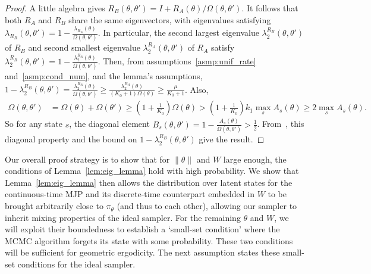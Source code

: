 \begin{proof}
A little algebra gives $R_B(\theta,\theta') = I + R_A(\theta)/\Omega(\theta,\theta')$. It 
follows that both $R_A$ and $R_B$ share the same eigenvectors, with 
eigenvalues satisfying 
$\lambda_{R_B}(\theta, \theta') = 1 - \frac{\lambda_{R_A}(\theta)}{\Omega(\theta,
\theta')}$. In particular, the second largest eigenvalue 
$\lambda_2^{R_B}(\theta,\theta')$ of $R_B$ and  
second smallest eigenvalue $\lambda^{R_A}_2(\theta,\theta')$ of $R_A$ satisfy  
$\lambda^{R_B}_2(\theta,\theta') = 1 - \frac{\lambda^{R_A}_2(\theta)}{\Omega(\theta, \theta')}$.
Then, from assumptions~\ref{asmp:unif_rate} and~\ref{asmp:cond_num}, and 
the lemma's assumptions, 
$1 - \lambda^{R_B}_2(\theta,\theta') = \frac{\lambda^{R_A}_2(\theta)}{\Omega(\theta, \theta')} 
\ge \frac{\lambda^{R_A}_2(\theta)}{(K_0+1)\Omega(\theta)} 
\ge \frac{\mu}{K_0+1} $. 
Also, 
\begin{align*}
\Omega(\theta, \theta') &= \Omega(\theta) + \Omega(\theta') \ge (1 + \frac{1}{K_0})\Omega(\theta)
 > (1 + \frac{1}{K_0})k_1\max_s A_{s}(\theta) \ge 2\max_s A_{s}(\theta). %
\end{align*}
So for any state $s$, the diagonal element $B_s(\theta, \theta') = 1 - 
\frac{A_s(\theta)}{\Omega(\theta, \theta')}> \frac{1}{2}$.
From~\cite{fill1991}, this diagonal property and the bound 
on $1-\lambda_2^{R_B}(\theta,\theta')$ give the result.
\end{proof}

Our overall proof strategy is to show that for {$\| \theta \|$} and $W$ large 
enough, the conditions of Lemma~\ref{lem:eig_lemma} hold with 
high probability. We show that Lemma~\ref{lem:eig_lemma} then allows the 
distribution over latent states for the continuous-time MJP and its 
discrete-time counterpart embedded in $W$ to be brought arbitrarily 
close to $\pi_\theta$ (and thus to each other), allowing our sampler 
to inherit mixing properties of the ideal sampler. For the remaining 
$\theta$ and $W$, we will exploit their boundedness to establish a 
`small-set condition' where the MCMC algorithm forgets its state with 
some probability. These two conditions will be sufficient for 
geometric ergodicity. The next assumption states these small-set conditions 
for the ideal sampler.

